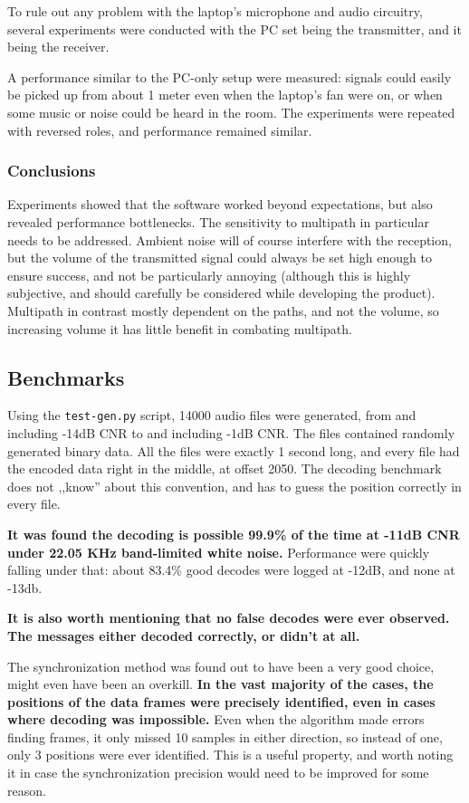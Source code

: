 \documentclass[a4paper]{article}
\begin{document}
To rule out any problem with the laptop's microphone and audio 
circuitry, several experiments were conducted with the PC set being the 
transmitter, and it being the receiver.

A performance similar to the PC-only setup were measured: signals could 
easily be picked up from about 1 meter even when the laptop's fan were 
on, or when some music or noise could be heard in the room. The
experiments were repeated with reversed roles, and performance remained
similar.

\subsubsection{Conclusions}

Experiments showed that the software worked beyond expectations, but also
revealed performance bottlenecks. The sensitivity to multipath in
particular needs to be addressed. Ambient noise will of course interfere
with the reception, but the volume of the transmitted signal could always
be set high enough to ensure success, and not be particularly annoying
(although this is highly subjective, and should carefully be considered
while developing the product). Multipath in contrast mostly dependent on
the paths, and not the volume, so increasing volume it has little
benefit in combating multipath.

\subsection{Benchmarks}

Using the \texttt{test-gen.py} script, 14000 audio files were 
generated, from and including -14dB CNR to and including -1dB CNR. The 
files contained randomly generated binary data. All the files were 
exactly 1 second long, and every file had the encoded data right in the 
middle, at offset 2050. The decoding benchmark does not ,,know'' about 
this convention, and has to guess the position correctly in every file.

\textbf{It was found the decoding is possible 99.9\% of the time at 
-11dB CNR under 22.05 KHz band-limited white noise.} Performance were 
quickly falling under that: about 83.4\% good decodes were logged at 
-12dB, and none at -13db.

\textbf{It is also worth mentioning that no false decodes were ever
observed. The messages either decoded correctly, or didn't at all.}

The synchronization method was found out to have been a very good 
choice, might even have been an overkill. \textbf{In the vast majority
of the cases, the positions of the data frames were precisely 
identified, even in cases where decoding was impossible.} Even when the
algorithm made errors finding frames, it only missed 10 samples in 
either direction, so instead of one, only 3 positions were ever 
identified. This is a useful property, and worth noting it in case the
synchronization precision would need to be improved for some reason.
\end{document}

